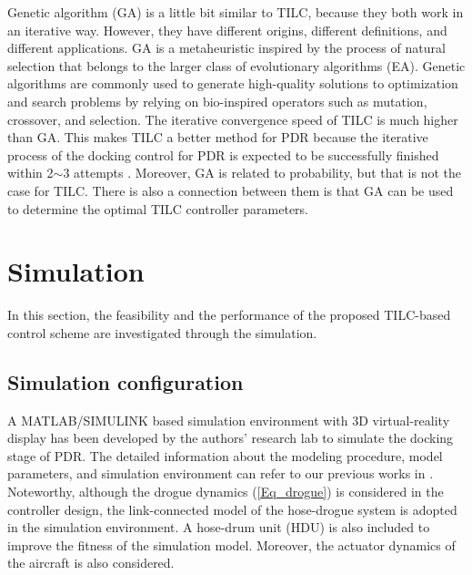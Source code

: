 Genetic algorithm (GA) is a little bit similar to TILC, because they both work in an iterative way. However, they have different origins, different definitions, and different applications. GA is a metaheuristic inspired by the process of natural selection that belongs to the larger class of evolutionary algorithms (EA). Genetic algorithms are commonly used to generate high-quality solutions to optimization and search problems by relying on bio-inspired operators such as mutation, crossover, and selection. The iterative convergence speed of TILC is much higher than GA. This makes TILC a better method for PDR because the iterative process of the docking
control for PDR is expected to be successfully finished within 2$\sim$3 attempts \cite{NATO-2004-3}. Moreover, GA is related to probability, but that is not the case for TILC. There is also a connection between them is that GA can be used to determine the optimal TILC controller parameters.


\section{Simulation}

\label{Simulation}

In this section, the feasibility and the performance of the proposed
TILC-based control scheme are investigated through the simulation.

\subsection{Simulation configuration}

A MATLAB/SIMULINK based simulation environment with 3D virtual-reality display
has been developed by the authors' research lab to simulate the docking stage
of PDR. The detailed information about the modeling procedure, model
parameters, and simulation environment can refer to our previous works in
\cite{dai2016modeling,wei2016drogue}. Noteworthy, although the drogue dynamics
(\ref{Eq_drogue}) is considered in the controller design, the link-connected
model of the hose-drogue system is adopted in the simulation environment. A
hose-drum unit (HDU) is also included to improve the fitness of the simulation model.
Moreover, the actuator dynamics of the aircraft is also considered.


